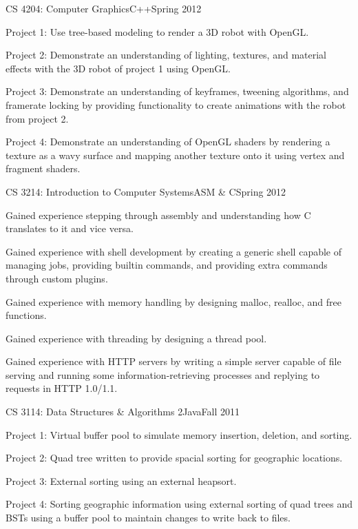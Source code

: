 \documentclass[10pt,a4paper]{article}
\begin{document}
{\begin{resumeinfo}{CS 4204: Computer Graphics}{C++}{Spring 2012}
         \item Project 1: Use tree-based modeling to render a 3D robot with OpenGL.
         \item Project 2: Demonstrate an understanding of lighting, textures, and material
               effects with the 3D robot of project 1 using OpenGL.
         \item Project 3: Demonstrate an understanding of keyframes, tweening algorithms, and
               framerate locking by providing functionality to create animations with the robot
               from project 2.
         \item Project 4: Demonstrate an understanding of OpenGL shaders by rendering a
               texture as a wavy surface and mapping another texture onto it using vertex and
               fragment shaders.
     \end{resumeinfo}
     \addvspace{1em}
     \begin{resumeinfo}{CS 3214: Introduction to Computer Systems}{ASM \& C}{Spring 2012}
         \item Gained experience stepping through assembly and understanding how C
               translates to it and vice versa.
         \item Gained experience with shell development by creating a generic shell capable of
               managing jobs, providing builtin commands, and providing extra commands
               through custom plugins.
         \item Gained experience with memory handling by designing malloc, realloc, and free
               functions.
         \item Gained experience with threading by designing a thread pool.
         \item Gained experience with HTTP servers by writing a simple server capable of file
               serving and running some information-retrieving processes and replying to
               requests in HTTP 1.0/1.1.
     \end{resumeinfo}
     \addvspace{1em}
     \begin{resumeinfo}{CS 3114: Data Structures \& Algorithms 2}{Java}{Fall 2011}
         \item Project 1: Virtual buffer pool to simulate memory insertion, deletion, and sorting.
         \item Project 2: Quad tree written to provide spacial sorting for geographic locations.
         \item Project 3: External sorting using an external heapsort.
         \item Project 4: Sorting geographic information using external sorting of quad trees and
               BSTs using a buffer pool to maintain changes to write back to files.
     \end{resumeinfo}
    }
\end{document}
